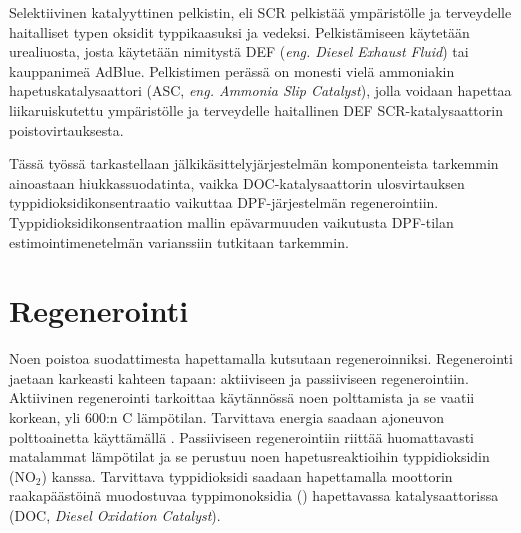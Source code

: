 Selektiivinen katalyyttinen pelkistin, eli SCR pelkistää ympäristölle ja terveydelle haitalliset typen oksidit typpikaasuksi ja vedeksi. Pelkistämiseen käytetään urealiuosta, josta käytetään nimitystä DEF (\emph{eng. Diesel Exhaust Fluid}) tai kauppanimeä AdBlue. Pelkistimen perässä on monesti vielä ammoniakin hapetuskatalysaattori (ASC, \emph{eng. Ammonia Slip Catalyst}), jolla voidaan hapettaa liikaruiskutettu ympäristölle ja terveydelle haitallinen DEF SCR-katalysaattorin poistovirtauksesta.
 \cite{dieselnet_scr}

Tässä työssä tarkastellaan jälkikäsittelyjärjestelmän komponenteista tarkemmin ainoastaan hiukkassuodatinta, vaikka DOC-katalysaattorin ulosvirtauksen typpidioksidikonsentraatio vaikuttaa DPF-järjestelmän regenerointiin. Typpidioksidikonsentraation mallin epävarmuuden vaikutusta DPF-tilan estimointimenetelmän varianssiin tutkitaan tarkemmin.



\section{Regenerointi}
Noen poistoa suodattimesta hapettamalla kutsutaan regeneroinniksi. Regenerointi jaetaan karkeasti kahteen tapaan: aktiiviseen ja passiiviseen regenerointiin. 
Aktiivinen regenerointi tarkoittaa käytännössä noen polttamista ja se
vaatii korkean, yli 600:n \degree C lämpötilan. Tarvittava energia saadaan ajoneuvon polttoainetta käyttämällä \cite{dieselnet_dpf}. Passiiviseen regenerointiin riittää huomattavasti matalammat lämpötilat ja se perustuu noen hapetusreaktioihin typpidioksidin (NO\(_2\)) kanssa. Tarvittava typpidioksidi saadaan hapettamalla moottorin raakapäästöinä muodostuvaa typpimonoksidia () hapettavassa katalysaattorissa (DOC, \emph{Diesel Oxidation Catalyst}).

